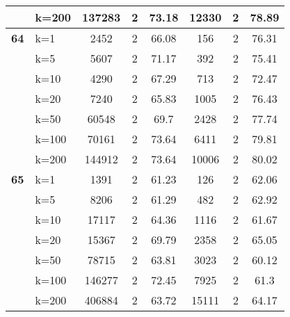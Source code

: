 \begin{table}[htbp]
\begin{tabular}{|l|l|c|c|c|c|c|c|}
     & k=200 & 137283 & 2 & 73.18 & 12330 & 2 & 78.89 \\ \hline
    \multicolumn{1}{|r|}{\textbf{64}} & k=1 & 2452 & 2 & 66.08 & 156 & 2 & 76.31 \\ 
     & k=5 & 5607 & 2 & 71.17 & 392 & 2 & 75.41 \\ 
     & k=10 & 4290 & 2 & 67.29 & 713 & 2 & 72.47 \\ 
     & k=20 & 7240 & 2 & 65.83 & 1005 & 2 & 76.43 \\ 
     & k=50 & 60548 & 2 & 69.7 & 2428 & 2 & 77.74 \\ 
     & k=100 & 70161 & 2 & 73.64 & 6411 & 2 & 79.81 \\ 
     & k=200 & 144912 & 2 & 73.64 & 10006 & 2 & 80.02 \\ \hline
    \multicolumn{1}{|r|}{\textbf{65}} & k=1 & 1391 & 2 & 61.23 & 126 & 2 & 62.06 \\ 
     & k=5 & 8206 & 2 & 61.29 & 482 & 2 & 62.92 \\ 
     & k=10 & 17117 & 2 & 64.36 & 1116 & 2 & 61.67 \\ 
     & k=20 & 15367 & 2 & 69.79 & 2358 & 2 & 65.05 \\ 
     & k=50 & 78715 & 2 & 63.81 & 3023 & 2 & 60.12 \\ 
     & k=100 & 146277 & 2 & 72.45 & 7925 & 2 & 61.3 \\ 
     & k=200 & 406884 & 2 & 63.72 & 15111 & 2 & 64.17 \\ \hline
    \end{tabular}
\end{table}
